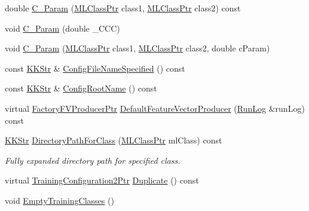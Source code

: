 \begin{DoxyCompactItemize}
double \hyperlink{class_k_k_m_l_l_1_1_training_configuration2_a8cd3838dfc6cb298b61f880095878ac0}{C\+\_\+\+Param} (\hyperlink{namespace_k_k_m_l_l_ac272393853d59e72e8456f14cd6d8c23}{M\+L\+Class\+Ptr} class1, \hyperlink{namespace_k_k_m_l_l_ac272393853d59e72e8456f14cd6d8c23}{M\+L\+Class\+Ptr} class2) const 
\item 
void \hyperlink{class_k_k_m_l_l_1_1_training_configuration2_aa2a2ffe37ca795648e5499d735908c92}{C\+\_\+\+Param} (double \+\_\+\+C\+CC)
\item 
void \hyperlink{class_k_k_m_l_l_1_1_training_configuration2_adc84978e0552e2796e87d480b643e387}{C\+\_\+\+Param} (\hyperlink{namespace_k_k_m_l_l_ac272393853d59e72e8456f14cd6d8c23}{M\+L\+Class\+Ptr} class1, \hyperlink{namespace_k_k_m_l_l_ac272393853d59e72e8456f14cd6d8c23}{M\+L\+Class\+Ptr} class2, double c\+Param)
\item 
const \hyperlink{class_k_k_b_1_1_k_k_str}{K\+K\+Str} \& \hyperlink{class_k_k_m_l_l_1_1_training_configuration2_af8744817d3fe760c1d73912fb46fb8d0}{Config\+File\+Name\+Specified} () const 
\item 
const \hyperlink{class_k_k_b_1_1_k_k_str}{K\+K\+Str} \& \hyperlink{class_k_k_m_l_l_1_1_training_configuration2_a987a84624bebfb9806b708fa252cb98c}{Config\+Root\+Name} () const 
\item 
virtual \hyperlink{namespace_k_k_m_l_l_a82812d1feb85a6cff72d059bc67bb90e}{Factory\+F\+V\+Producer\+Ptr} \hyperlink{class_k_k_m_l_l_1_1_training_configuration2_a90fd82a6c680ea2a5dd8f5dcd75a8bb7}{Default\+Feature\+Vector\+Producer} (\hyperlink{class_k_k_b_1_1_run_log}{Run\+Log} \&run\+Log) const 
\item 
\hyperlink{class_k_k_b_1_1_k_k_str}{K\+K\+Str} \hyperlink{class_k_k_m_l_l_1_1_training_configuration2_a335cc9ccbfa1b054d0b6b51a94c6d86f}{Directory\+Path\+For\+Class} (\hyperlink{namespace_k_k_m_l_l_ac272393853d59e72e8456f14cd6d8c23}{M\+L\+Class\+Ptr} ml\+Class) const 
\begin{DoxyCompactList}\small\item\em Fully expanded directory path for specified class.\end{DoxyCompactList}\item 
virtual \hyperlink{class_k_k_m_l_l_1_1_training_configuration2_a16dd529d03718630f6f58f572e9535f8}{Training\+Configuration2\+Ptr} \hyperlink{class_k_k_m_l_l_1_1_training_configuration2_a6c9f1b9b8a4adaed64b5d0a5a31e2458}{Duplicate} () const 
\item 
void \hyperlink{class_k_k_m_l_l_1_1_training_configuration2_aa90043c22d4bcbffc4a75a1d55bac942}{Empty\+Training\+Classes} ()

\end{DoxyCompactItemize}
